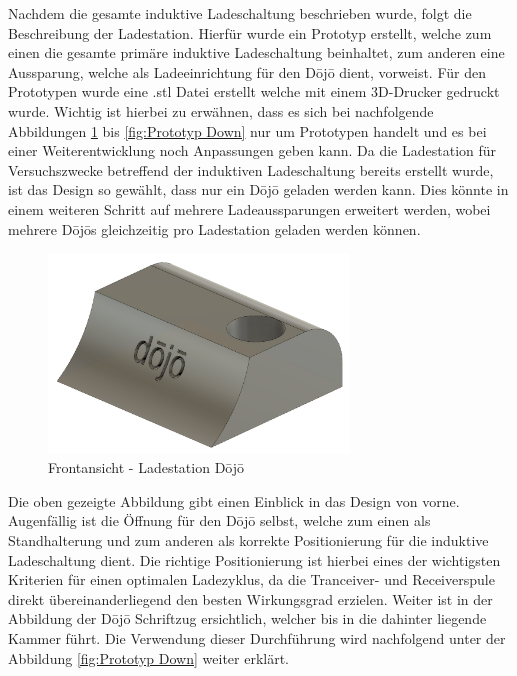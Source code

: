 Nachdem die gesamte induktive Ladeschaltung beschrieben wurde, folgt die Beschreibung der Ladestation. Hierfür wurde ein Prototyp erstellt, welche zum einen die gesamte primäre induktive Ladeschaltung beinhaltet, zum anderen eine Aussparung, welche als Ladeeinrichtung für den Dōjō dient, vorweist. Für den Prototypen wurde eine .stl Datei erstellt welche mit einem 3D-Drucker gedruckt wurde. Wichtig ist hierbei zu erwähnen, dass es sich bei nachfolgende Abbildungen \ref{fig:Prototyp Front} bis \ref{fig:Prototyp Down} nur um Prototypen handelt und es bei einer Weiterentwicklung noch Anpassungen geben kann. Da die Ladestation für Versuchszwecke betreffend der induktiven Ladeschaltung bereits erstellt wurde, ist das Design so gewählt, dass nur ein Dōjō geladen werden kann. Dies könnte in einem weiteren Schritt auf mehrere Ladeaussparungen erweitert werden, wobei mehrere Dōjōs gleichzeitig pro Ladestation geladen werden können. 

\begin{figure}[H]
	\begin{center}
		\includegraphics[width=80mm]{data/DojoLadestation01.png}
		\caption[Prototyp Ladestation Frontansicht]{Frontansicht - Ladestation Dōjō} %
		\label{fig:Prototyp Front}
	\end{center}
\end{figure}

Die oben gezeigte Abbildung gibt einen Einblick in das Design von vorne. Augenfällig ist die Öffnung für den Dōjō selbst, welche zum einen als Standhalterung und zum anderen als korrekte Positionierung für die induktive Ladeschaltung dient. Die richtige Positionierung ist hierbei eines der wichtigsten Kriterien für einen optimalen Ladezyklus, da die Tranceiver- und Receiverspule direkt übereinanderliegend den besten Wirkungsgrad erzielen. Weiter ist in der Abbildung der Dōjō Schriftzug ersichtlich, welcher bis in die dahinter liegende Kammer führt. Die Verwendung dieser Durchführung wird nachfolgend unter der Abbildung \ref{fig:Prototyp Down} weiter erklärt. 


